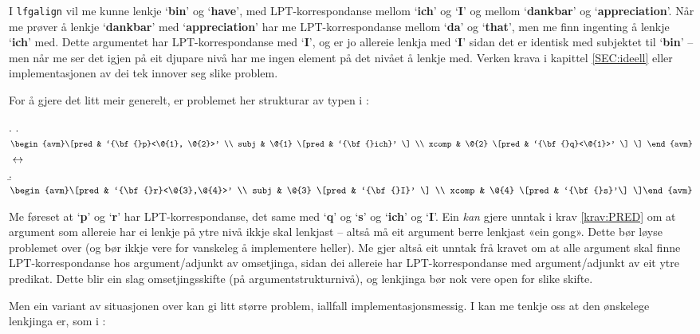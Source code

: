 \documentclass[12pt,a4paper,oneside,draft]{report}
\newcommand{\p}[1]{`\textbf{#1}'}
\begin{document}
I \texttt{lfgalign} vil me kunne lenkje \p{bin} og \p{have}, med
 LPT-korrespondanse mellom \p{ich} og \p{I} og mellom \p{dankbar} og
 \p{appreciation}. Når me prøver å lenkje \p{dankbar} med
 \p{appreciation} har me LPT-korrespondanse mellom \p{da} og \p{that},
 men me finn ingenting å lenkje \p{ich} med. Dette argumentet har
 LPT-korrespondanse med \p{I}, og er jo allereie lenkja med \p{I}
 sidan det er identisk med subjektet til \p{bin} -- men når me ser det
 igjen på eit djupare nivå har me ingen element på det nivået å lenkje
 med. Verken krava i kapittel \ref{SEC:ideell} eller implementasjonen
 av dei tek innover seg slike problem.

For å gjere det litt meir generelt, er problemet her strukturar av
 typen i \Next:

{\avmoptions{}
\ex. \a. $\begin{avm}\[pred & `{\bf{}p}<\@{1}, \@{2}>'  \\
     subj & \@{1} \[pred &  `{\bf{}ich}' \] \\
     xcomp & \@{2} \[pred & `{\bf{}q}<\@{1}>' \] \] \end{avm}$
     $\\\\\leftrightarrow$\\
     \b. $\begin{avm}\[pred & `{\bf{}r}<\@{3},\@{4}>' \\
     subj & \@{3} \[pred &  `{\bf{}I}' \]  \\
     xcomp & \@{4} \[pred & `{\bf{}s}'\] \]\end{avm}$

}

Me føreset at \p{p} og \p{r} har LPT-korrespondanse, det same med
 \p{q} og \p{s} og \p{ich} og \p{I}. Ein \emph{kan} gjere unntak i krav
 \ref{krav:PRED} om at argument som allereie har ei lenkje på ytre
 nivå ikkje skal lenkjast -- altså må eit argument berre lenkjast «ein
 gong». Dette bør løyse problemet over (og bør ikkje vere for
 vanskeleg å implementere heller). Me gjer altså eit unntak frå kravet
 om at alle argument skal finne LPT-korrespondanse hos
 argument/adjunkt av omsetjinga, sidan dei allereie har
 LPT-korrespondanse med argument/adjunkt av eit ytre predikat. Dette
 blir ein slag omsetjingsskifte (på argumentstrukturnivå), og
 lenkjinga bør nok vere open for slike skifte.

Men ein variant av situasjonen over kan gi litt større problem,
 iallfall implementasjonsmessig. I \NNext kan me tenkje oss at den
 ønskelege lenkjinga er, som i \Last:
\end{document}
